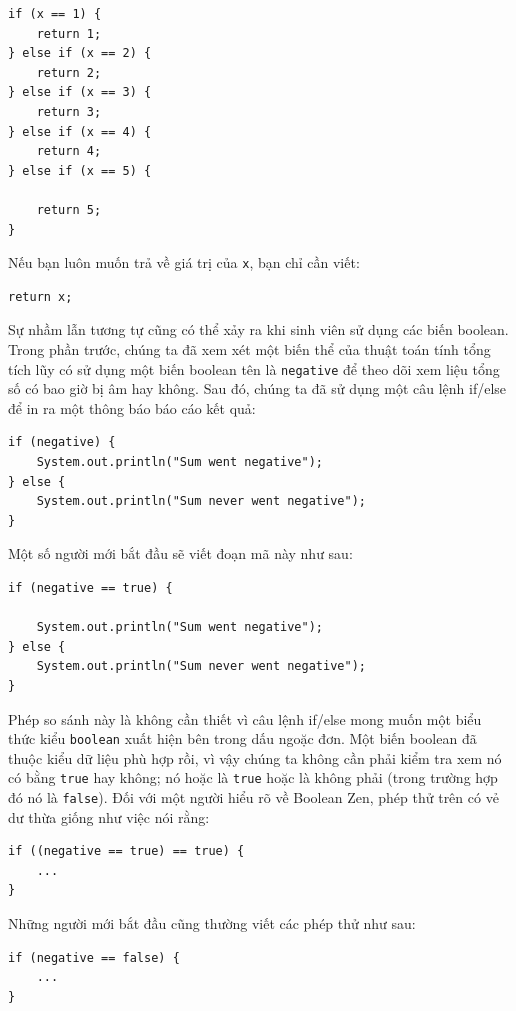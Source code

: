 \begin{verbatim}
if (x == 1) {
    return 1;
} else if (x == 2) {
    return 2;
} else if (x == 3) {
    return 3;
} else if (x == 4) {
    return 4;
} else if (x == 5) {

    return 5;
}
\end{verbatim}

Nếu bạn luôn muốn trả về giá trị của \texttt{x}, bạn chỉ cần viết:

\begin{verbatim}
return x;
\end{verbatim}

Sự nhầm lẫn tương tự cũng có thể xảy ra khi sinh viên sử dụng các biến boolean. Trong phần trước, chúng ta đã xem xét một biến thể của thuật toán tính tổng tích lũy có sử dụng một biến boolean tên là \texttt{negative} để theo dõi xem liệu tổng số có bao giờ bị âm hay không. Sau đó, chúng ta đã sử dụng một câu lệnh if/else để in ra một thông báo báo cáo kết quả:

\begin{verbatim}
if (negative) {
    System.out.println("Sum went negative");
} else {
    System.out.println("Sum never went negative");
}
\end{verbatim}

Một số người mới bắt đầu sẽ viết đoạn mã này như sau:

\begin{verbatim}
if (negative == true) {

    System.out.println("Sum went negative");
} else {
    System.out.println("Sum never went negative");
}
\end{verbatim}

Phép so sánh này là không cần thiết vì câu lệnh if/else mong muốn một biểu thức kiểu \texttt{boolean} xuất hiện bên trong dấu ngoặc đơn. Một biến boolean đã thuộc kiểu dữ liệu phù hợp rồi, vì vậy chúng ta không cần phải kiểm tra xem nó có bằng \texttt{true} hay không; nó hoặc là \texttt{true} hoặc là không phải (trong trường hợp đó nó là \texttt{false}). Đối với một người hiểu rõ về Boolean Zen, phép thử trên có vẻ dư thừa giống như việc nói rằng:

\begin{verbatim}
if ((negative == true) == true) {
    ...
}
\end{verbatim}

Những người mới bắt đầu cũng thường viết các phép thử như sau:

\begin{verbatim}
if (negative == false) {
    ...
}
\end{verbatim}